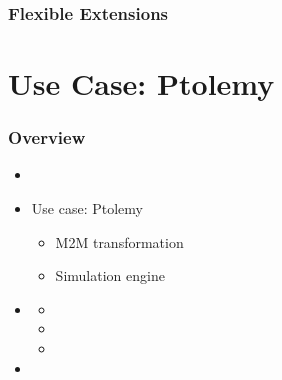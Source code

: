 \begin{frame}
  \frametitle{Flexible Extensions}
  \begin{center} 
				\listingjava {} 
  \end{center}
\end{frame}


\section[Use Case: Ptolemy]{Use Case: Ptolemy}
\begin{frame}
  \frametitle{Overview}
    \begin{itemize}
	      \item {}
	      \item Use case: Ptolemy 
        \begin{itemize}
       	       \item M2M transformation
       	       \item Simulation engine
        \end{itemize}
	      \item {}
        \begin{itemize}
	            \item {}
	            \item {}
	            \item {}
        \end{itemize}
	      \item {}
    \end{itemize}
\end{frame}


